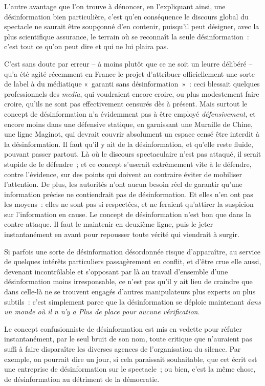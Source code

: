 \documentclass[french,twoside]{book} %
\begin{document}
L’autre avantage que l’on trouve à dénoncer, en l’expliquant ainsi, une désinformation bien particulière, c’est qu’en conséquence le discours global du spectacle ne saurait être soupçonné d’en contenir, puisqu’il peut désigner, avec la plus scientifique assurance, le terrain où se reconnaît la seule désinformation : c’est tout ce qu’on peut dire et qui ne lui plaira pas.\par
C’est sans doute par erreur – à moins plutôt que ce ne soit un leurre délibéré – qu’a été agité récemment en France le projet d’attribuer officiellement une sorte de label à du médiatique « garanti sans désinformation » : ceci blessait quelques professionnels des \emph{media}, qui voudraient encore croire, ou plus modestement faire croire, qu’ils ne sont pas effectivement censurés dès à présent. Mais surtout le concept de désinformation n’a évidemment pas à être employé \emph{défensivement}, et encore moins dans une défensive statique, en garnissant une Muraille de Chine, une ligne Maginot, qui devrait couvrir absolument un espace censé être interdit à la désinformation. Il faut qu’il y ait de la désinformation, et qu’elle reste fluide, pouvant passer partout. Là où le discours spectaculaire n’est pas attaqué, il serait stupide de le défendre ; et ce concept s’userait extrêmement vite à le défendre, contre l’évidence, sur des points qui doivent au contraire éviter de mobiliser l’attention. De plus, les autorités n’ont aucun besoin réel de garantir qu’une information précise ne contiendrait pas de désinformation. Et elles n’en ont pas les moyens : elles ne sont pas si respectées, et ne feraient qu’attirer la suspicion sur l’information en cause. Le concept de désinformation n’est bon que dans la contre-attaque. Il faut le maintenir en deuxième ligne, puis le jeter instantanément en avant pour repousser toute vérité qui viendrait à surgir.\par
Si parfois une sorte de désinformation désordonnée risque d’apparaître, au service de quelques intérêts particuliers passagèrement en conflit, et d’être crue elle aussi, devenant incontrôlable et s’opposant par là au travail d’ensemble d’une désinformation moins irresponsable, ce n’est pas qu’il y ait lieu de craindre que dans celle-là ne se trouvent engagés d’autres manipulateurs plus experts ou plus subtils : c’est simplement parce que la désinformation se déploie maintenant \emph{dans un monde où il n n’y a Plus de place pour aucune vérification}.\par
Le concept confusionniste de désinformation est mis en vedette pour réfuter instantanément, par le seul bruit de son nom, toute critique que n’auraient pas suffi à faire disparaître les diverses agences de l’organisation du silence. Par exemple, on pourrait dire un jour, si cela paraissait souhaitable, que cet écrit est une entreprise de désinformation sur le spectacle ; ou bien, c’est la même chose, de désinformation au détriment de la démocratie.\par
\end{document}
